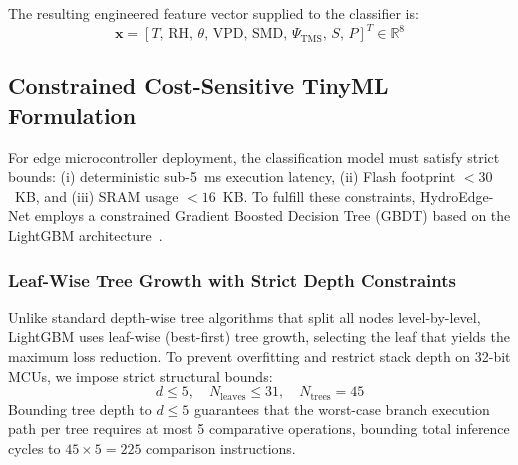 The resulting engineered feature vector supplied to the classifier is:
\begin{equation}
\mathbf{x} = \left[ T, \, \text{RH}, \, \theta, \, \text{VPD}, \, \text{SMD}, \, \Psi_{\text{TMS}}, \, S, \, P \right]^T \in \mathbb{R}^8
\label{eq:feature_vector}
\end{equation}

\subsection{Constrained Cost-Sensitive TinyML Formulation}

For edge microcontroller deployment, the classification model must satisfy strict bounds: (i) deterministic sub-5~ms execution latency, (ii) Flash footprint $<30$~KB, and (iii) SRAM usage $<16$~KB. To fulfill these constraints, HydroEdge-Net employs a constrained Gradient Boosted Decision Tree (GBDT) based on the LightGBM architecture~\cite{ke2017lightgbm}.

\subsubsection{Leaf-Wise Tree Growth with Strict Depth Constraints}
Unlike standard depth-wise tree algorithms that split all nodes level-by-level, LightGBM uses leaf-wise (best-first) tree growth, selecting the leaf that yields the maximum loss reduction. To prevent overfitting and restrict stack depth on 32-bit MCUs, we impose strict structural bounds:
\begin{equation}
d \le 5, \quad N_{\text{leaves}} \le 31, \quad N_{\text{trees}} = 45
\label{eq:tree_bounds}
\end{equation}
Bounding tree depth to $d \le 5$ guarantees that the worst-case branch execution path per tree requires at most 5 comparative operations, bounding total inference cycles to $45 \times 5 = 225$ comparison instructions.

